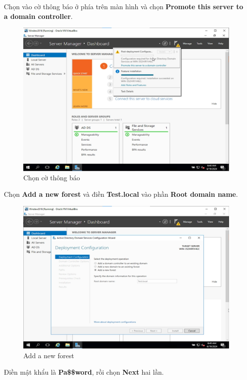  Chọn vào cờ thông báo ở phía trên màn hình và chọn \textbf{Promote this server to a domain controller}.

\begin{figure}[!htb]
    \centering
    \includegraphics[width=0.9\linewidth]{figure//chapter4//lab4_1/promote_server.png}
    \caption{Chọn cờ thông báo}
    \label{fig:enter-label}
\end{figure}

 Chọn \textbf{Add a new forest} và điền \textbf{Test.local} vào phần \textbf{Root domain name}.

\begin{figure}[!htb]
    \centering
    \includegraphics[width=0.9\linewidth]{figure//chapter4//lab4_1/test_local.png}
    \caption{Add a new forest}
    \label{fig:enter-label}
\end{figure}

 Điền mật khẩu là \textbf{Pa\$\$word}, rồi chọn \textbf{Next} hai lần.

